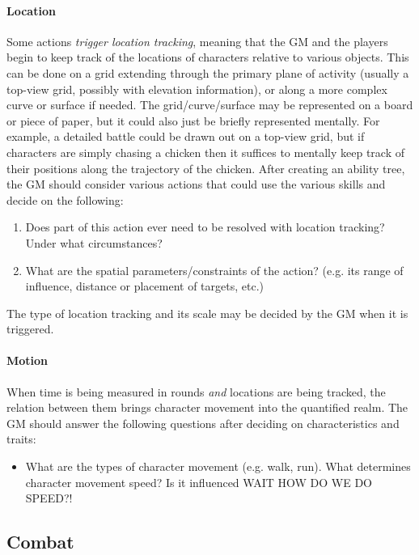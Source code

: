 \documentclass[12pt]{article}
\newcommand{\notes}[1]{{\color{Tan} #1}}
\begin{document}
\paragraph{Location}
Some actions \emph{trigger location tracking},
meaning that the GM and the players begin to keep track of the locations of characters relative to various objects.
This can be done on a grid extending through the primary plane of activity (usually a top-view grid, possibly with elevation information),
or along a more complex curve or surface if needed.
The grid/curve/surface may be represented on a board or piece of paper, but it could also just be briefly represented mentally.
For example, a detailed battle could be drawn out on a top-view grid,
but if characters are simply chasing a chicken then it suffices to mentally keep track
of their positions along the trajectory of the chicken.
After creating an ability tree, the GM should consider various actions
that could use the various skills and decide on the following:
\vspace{-1em}
\begin{enumerate}
\item\label{itm:grid:trigger}
Does part of this action ever need to be resolved with location tracking? Under what circumstances?
\item\label{itm:grid:length}
What are the spatial parameters/constraints of the action? (e.g. its range of influence, distance or placement of targets, etc.)
\end{enumerate}
The type of location tracking and its scale may be decided by the GM when it is triggered.



\paragraph{Motion}
When time is being measured in rounds \emph{and} locations are being tracked,
the relation between them brings character movement into the quantified realm.
The GM should answer the following questions after deciding on characteristics and traits:
\vspace{-1em}
\begin{itemize}
\item
What are the types of character movement (e.g. walk, run).
What determines character movement speed?
Is it influenced \notes{WAIT HOW DO WE DO SPEED?!}
\end{itemize}




\subsection{Combat}\label{sec:qombat}
\end{document}
